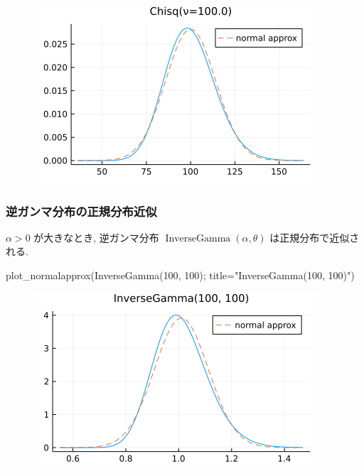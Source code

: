 \documentclass[
  letterpaper,
  DIV=11,
  numbers=noendperiod]{scrartcl}
\newenvironment{Shaded}{\begin{snugshade}}{\end{snugshade}}
\newcommand{\FloatTok}[1]{\textcolor[rgb]{0.68,0.00,0.00}{#1}}
\newcommand{\FunctionTok}[1]{\textcolor[rgb]{0.28,0.35,0.67}{#1}}
\newcommand{\NormalTok}[1]{\textcolor[rgb]{0.00,0.23,0.31}{#1}}
\newcommand{\OperatorTok}[1]{\textcolor[rgb]{0.37,0.37,0.37}{#1}}
\newcommand{\StringTok}[1]{\textcolor[rgb]{0.13,0.47,0.30}{#1}}
\begin{document}
\begin{figure}[H]

{\centering \includegraphics{05 Central limit theorem_files/figure-pdf/cell-123-output-1.png}

}

\end{figure}

\hypertarget{ux9006ux30acux30f3ux30deux5206ux5e03ux306eux6b63ux898fux5206ux5e03ux8fd1ux4f3c}{%
\subsubsection{逆ガンマ分布の正規分布近似}\label{ux9006ux30acux30f3ux30deux5206ux5e03ux306eux6b63ux898fux5206ux5e03ux8fd1ux4f3c}}

\(\alpha > 0\) が大きなとき, 逆ガンマ分布
\(\operatorname{InverseGamma}(\alpha, \theta)\) は正規分布で近似される.

\begin{Shaded}
\begin{Highlighting}[]
\FunctionTok{plot\_normalapprox}\NormalTok{(}\FunctionTok{InverseGamma}\NormalTok{(}\FloatTok{100}\NormalTok{, }\FloatTok{100}\NormalTok{); title}\OperatorTok{=}\StringTok{"InverseGamma(100, 100)"}\NormalTok{)}
\end{Highlighting}
\end{Shaded}

\begin{figure}[H]

{\centering \includegraphics{05 Central limit theorem_files/figure-pdf/cell-124-output-1.png}

}

\end{figure}
\end{document}
